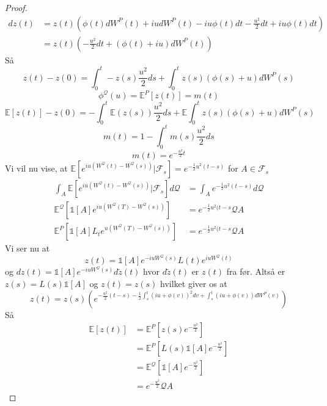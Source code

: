 \documentclass[12pt]{report}
\theoremstyle{break}
\newtheorem*{proof}{Bevis}
\theoremstyle{break}
\newcommand{\EE}{\mathbb{E}}
\newcommand{\Q}{\mathcal{Q}}
\newcommand{\FI}{\mathcal{F}}
\newcommand{\1}{\mathds{1}}
\begin{document}
\begin{proof}
\begin{align*}
		dz(t)&=z(t)\left( \phi(t)dW^P(t)+iudW^P(t)-iu\phi(t)dt-\frac{u^2}{2}dt+iu\phi(t)dt\right)\\
		&=z(t)\left( -\frac{u^2}{2}dt+\left( \phi(t)+iu \right)dW^P(t) \right)
	\end{align*}
	Så\[ z(t)-z(0)=\int_{0}^{t}-z(s)\frac{u^2}{2}ds+\int_{0}^{t}z(s)\left( \phi(s)+u \right)dW^P(s) \]
	\[ \phi^\Q(u)=\EE^P[z(t)]=m(t) \]
	\[\EE[z(t)]-z(0)=-\int_{0}^{t}\EE(z(s))\frac{u^2}{2}ds+\EE\int_{0}^{t}z(s)(\phi(s)+u)dW^P(s)\]
	\[m(t)=1-\int_{0}^{t}m(s)\frac{u^2}{2}ds\]
	\[ m(t)=e^{-\frac{u^2}{2}t} \]
	Vi vil nu vise, at
	$\EE\left[e^{iu(W^\Q(t)-W^\Q(s))}\vert\FI_s\right] =e^{-\frac{1}{2}u^2(t-s)}$ for $A\in \FI_s$
	\begin{align*}
		\int_A \EE\left[  e^{iu(W^\Q(t)-W^\Q(s))}\vert\FI_s\right]d\Q&=\int_A e^{-\frac{1}{2}u^2(t-s)}d\Q\\
		\EE^\Q\left[ \1[A]e^{iu(W^\Q(T)-W^\Q(s))} \right]&=e^{-\frac{1}{2}u^2(t-s}\Q A\\
		\EE^P\left[ \1[A]L_t e^{u(W^\Q(T)-W^\Q(s))} \right]&=e^{-\frac{1}{2}u^2(t-s}\Q A
	\end{align*}
	Vi ser nu at\[ z(t)=\1[A]e^{-iuW^\Q(s)}L(t)e^{iuW^\Q(t)} \]
	og $dz(t)=\1[A]e^{-iuW^\Q(s)}d\tilde{z}(t)$ hvor $d\tilde{z}(t)$ er $z(t)$ fra før. Altså er $z(s)=L(s)\1[A]$ og $z(t)=z(s)$ hvilket giver os at
	\[ z(t)=z(s)\left( e^{-\frac{u^2}{2}(t-s)-\frac{1}{2}\int_{s}^{t}(iu+\phi(v))^2dv+\int_{s}^{t}(iu+\phi(v))dW^P(v)} \right) \]
	Så
	\begin{align*}
		\EE[z(t)]&=\EE^P\left[ z(s)e^{-\frac{u^2}{2}} \right]\\
		&= \EE^P\left[ L(s)\1[A]e^{-\frac{u^2}{2}} \right]\\
		&= \EE^\Q\left[ \1[A]e^{-\frac{u^2}{2}} \right]\\
		&=e^{-\frac{u^2}{2}}\Q A
	\end{align*}

\end{proof}
\end{document}
